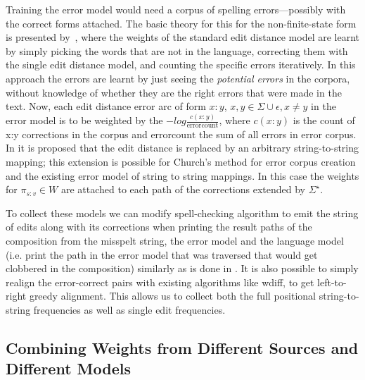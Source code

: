 \documentclass[a4paper,12pt]{article}
\begin{document}
Training the error model would need a corpus of spelling
errors---possibly with the correct forms attached. The basic theory for this
for the non-finite-state form is presented by~\cite{church1991probability},
where the weights of the standard edit distance model are learnt by simply
picking the words that are not in the language, correcting them with the single
edit distance model, and counting the specific errors iteratively. In this
approach the errors are learnt by just seeing the \emph{potential errors} in
the corpora, without knowledge of whether they are the right errors that were
made in the text. Now, each edit distance error arc of form $x:y$, $x, y \in
\Sigma \cup {\epsilon}, x \neq y$ in the error model is to be weighted by the $-log
\frac{c(x:y)}{\mathrm{error count}}$, where $c(x:y)$ is the count of x:y
corrections in the corpus and $\mathrm{error count}$ the sum of all errors in
error corpus. In \cite{brill2000improved} it is proposed that the
edit distance is replaced by an arbitrary string-to-string mapping; this
extension is possible for Church's method for error corpus creation and
the existing error model of string to string mappings. In this case the
weights for $\pi_{s:v} \in W$ are attached to each path of the corrections
extended by $\Sigma^{\star}$.

To collect these models we can modify spell-checking algorithm to emit the
string of edits along with its corrections when printing the result paths of
the composition from the misspelt string, the error model and the language
model (i.e. print the path in the error model that was traversed that would get
clobbered in the composition) similarly as is done in
\cite{ristad1998learning}. It is also possible to simply realign the
error-correct pairs with existing algorithms like wdiff, to get left-to-right
greedy alignment. This allows us to collect both the full positional
string-to-string frequencies as well as single edit frequencies.

\subsection{Combining Weights from Different Sources and Different Models}
\label{subsec:combining-weights}
\end{document}
